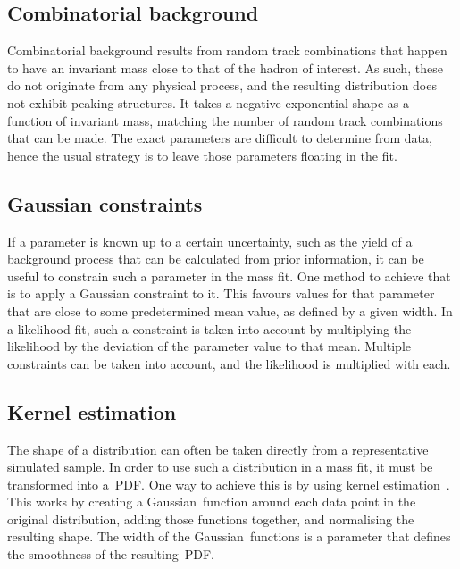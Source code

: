 \subsection{Combinatorial background}
Combinatorial background results from random track combinations that happen to have an invariant mass close to that of the hadron of interest.
As such, these do not originate from any physical process, and the resulting distribution does not exhibit peaking structures.
It takes a negative exponential shape as a function of invariant mass, matching the number of random track combinations that can be made.
The exact parameters are difficult to determine from data, hence the usual strategy is to leave those parameters floating in the fit.

\subsection{Gaussian constraints}
If a parameter is known up to a certain uncertainty, such as the yield of a background process that can be calculated from prior information, it can be useful to constrain such a parameter in the mass fit.
One method to achieve that is to apply a Gaussian constraint to it.
This favours values for that parameter that are close to some predetermined mean value, as defined by a given width.
In a likelihood fit, such a constraint is taken into account by multiplying the likelihood by the deviation of the parameter value to that mean.
Multiple constraints can be taken into account, and the likelihood is multiplied with each.

\subsection{Kernel estimation} \label{sec:methods_KernelEstimation}
The shape of a distribution can often be taken directly from a representative simulated sample.
In order to use such a distribution in a mass fit, it must be transformed into a~PDF.
One way to achieve this is by using kernel estimation~\cite{Cranmer:2000du}.
This works by creating a Gaussian~function around each data point in the original distribution, adding those functions together, and normalising the resulting shape.
The width of the Gaussian~functions is a parameter that defines the smoothness of the resulting~PDF.

